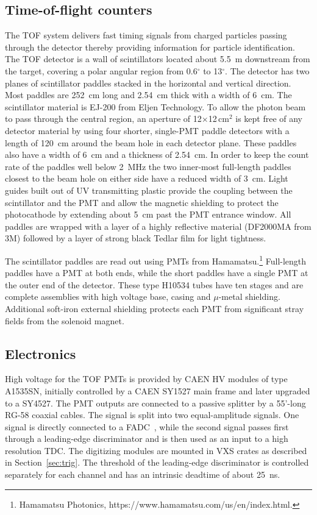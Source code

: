 \subsection[Time-of-Flight counters]{Time-of-flight counters \label{sec:tof}}
The TOF system delivers fast timing signals from charged particles passing through the detector thereby providing information for particle identification.
The TOF detector is a wall of scintillators located about 5.5~m downstream from the target, covering 
a polar angular region from 0.6$^{\circ}$ to 13$^{\circ}$. The detector has two planes of
scintillator paddles stacked in the horizontal and vertical direction. Most paddles are 252~cm long and 2.54~cm
thick with a width of 6~cm. 
The scintillator material is EJ-200 from Eljen Technology.
To allow the photon beam to pass through the central region,
an aperture of 12$\times$12\,cm$^2$ is kept
free of any detector material by using four shorter, single-PMT paddle detectors with a length of 120~cm around the beam hole
in each detector plane. These paddles also have a width of 6~cm and a thickness of 2.54~cm. In order to keep the
count rate of the paddles well below 2~MHz the two inner-most full-length paddles closest to the beam hole on either side have a reduced width of 3~cm.
Light guides built out of UV transmitting plastic provide the coupling between the scintillator and the PMT and allow the 
magnetic shielding to protect the photocathode by extending about 5~cm past the PMT entrance window. All paddles are wrapped
with a layer of a highly reflective material (DF2000MA from 3M) followed by a layer of strong black Tedlar film for light tightness. 

The scintillator paddles are read out using 
PMTs from Hamamatsu.\footnote{Hamamatsu Photonics, https://www.hamamatsu.com/us/en/index.html.} Full-length paddles
have a PMT at both ends, while the short paddles have a single PMT
at the outer end of the detector. These type H10534 tubes have ten stages and are complete assemblies with high voltage base, casing and $\mu$-metal shielding. Additional soft-iron external shielding protects each PMT from significant stray fields from the solenoid magnet.


\subsection{Electronics \label{sec:scelectronics}}
High voltage for the TOF PMTs is provided by CAEN HV modules of type A1535SN, initially controlled by a CAEN SY1527 main frame and
later upgraded to a SY4527.
The PMT outputs are connected to a passive splitter by a 55'-long RG-58 coaxial cables. The signal is split into two equal-amplitude signals. One signal is directly connected to a FADC~\cite{Dong:2007}, while the second signal passes first through a leading-edge discriminator and is then used as an input to a high resolution TDC. The digitizing modules are mounted in VXS crates as described in Section~\ref{sec:trig}.
The threshold of the leading-edge discriminator is controlled separately for each channel and has an intrinsic
deadtime of about 25~ns.

